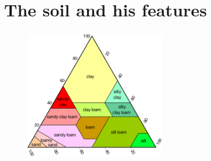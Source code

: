 \section{The soil and his features}
\begin{frame}
	\frametitle{\secname}
	\begin{minipage}{0.47\textwidth}
		\begin{figure}[ht!]
			\centering
			\includegraphics[height=5.5cm]{textural_soil}
		\end{figure}
	\end{minipage}
	\begin{minipage}{0.5\textwidth}
		
	\end{minipage}
\end{frame}